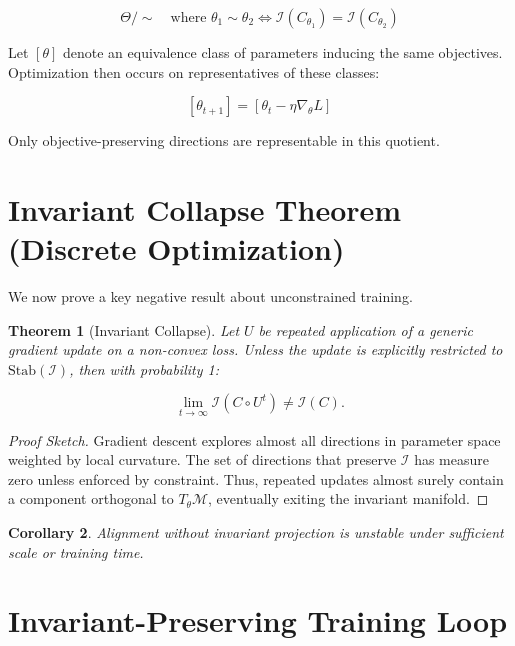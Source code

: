 \documentclass[11pt,a4paper]{article}
\theoremstyle{plain}
\newtheorem{theorem}{Theorem}[section]
\newtheorem{corollary}[theorem]{Corollary}
\theoremstyle{definition}
\theoremstyle{remark}
\numberwithin{equation}{section}
\newcommand{\Stab}{\text{Stab}}
\begin{document}
\[
\Theta / \sim \quad \text{where } \theta_1 \sim \theta_2 \iff \mathcal{I}(C_{\theta_1}) = \mathcal{I}(C_{\theta_2})
\]

Let $[\theta]$ denote an equivalence class of parameters inducing the same objectives.  
Optimization then occurs on representatives of these classes:

\[
[\theta_{t+1}] = [\theta_t - \eta \nabla_\theta L]_{} 
\]

Only objective-preserving directions are representable in this quotient.

\section{Invariant Collapse Theorem (Discrete Optimization)}

We now prove a key negative result about unconstrained training.

\begin{theorem}[Invariant Collapse]
Let $U$ be repeated application of a generic gradient update on a non-convex loss.  
Unless the update is explicitly restricted to $\Stab(\mathcal{I})$, then with probability 1:

\[
\lim_{t \to \infty} \mathcal{I}(C \circ U^t) \ne \mathcal{I}(C).
\]
\end{theorem}

\begin{proof}[Proof Sketch]
Gradient descent explores almost all directions in parameter space weighted by local curvature.  
The set of directions that preserve $\mathcal{I}$ has measure zero unless enforced by constraint.  
Thus, repeated updates almost surely contain a component orthogonal to $T_\theta \mathcal{M}$, eventually exiting the invariant manifold.
\end{proof}

\begin{corollary}
Alignment without invariant projection is unstable under sufficient scale or training time.
\end{corollary}

\section{Invariant-Preserving Training Loop}
\end{document}
